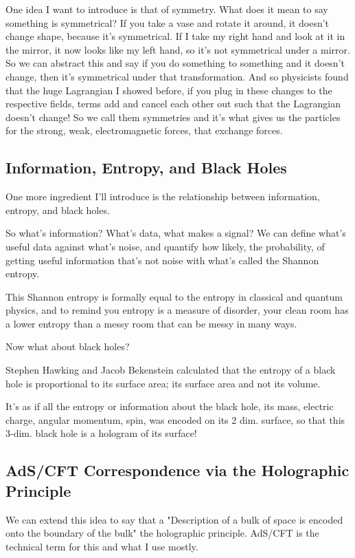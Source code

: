 \documentclass[10pt]{amsart}
\begin{document}
One idea I want to introduce is that of symmetry. What does it mean to say something is symmetrical? If you take a vase and rotate it around, it doesn't change shape, because it's symmetrical. If I take my right hand and look at it in the mirror, it now looks like my left hand, so it's not symmetrical under a mirror. So we can abstract this and say if you do something to something and it doesn't change, then it's symmetrical under that transformation. And so physicists found that the huge Lagrangian I showed before, if you plug in these changes to the respective fields, terms add and cancel each other out such that the Lagrangian doesn't change! So we call them symmetries and it's what gives us the particles for the strong, weak, electromagnetic forces, that exchange forces.

\subsection{Information, Entropy, and Black Holes}

One more ingredient I'll introduce is the relationship between information, entropy, and black holes. 

So what's information? What's data, what makes a signal? We can define what's useful data against what's noise, and quantify how likely, the probability, of getting useful information that's not noise with what's called the Shannon entropy. 

This Shannon entropy is formally equal to the entropy in classical and quantum physics, and to remind you entropy is a measure of disorder, your clean room has a lower entropy than a messy room that can be messy in many ways.

Now what about black holes?

Stephen Hawking and Jacob Bekenstein calculated that the entropy of a black hole is proportional to its surface area; its surface area and not its volume.

It's as if all the entropy or information about the black hole, its mass, electric charge, angular momentum, spin, was encoded on its 2 dim. surface, so that this 3-dim. black hole is a hologram of its surface!

\subsection{AdS/CFT Correspondence via the Holographic Principle}

We can extend this idea to say that a "Description of a bulk of space is encoded onto the boundary of the bulk" the holographic principle. AdS/CFT is the technical term for this and what I use mostly.
\end{document}
